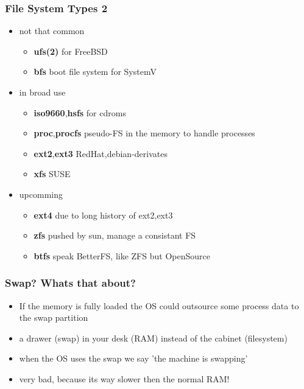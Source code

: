 \documentclass[draft,handout]{beamer}
\begin{document}
        \begin{frame}
			\frametitle{File System Types 2}
            \begin{itemize}
                    \item<1-> not that common
                    \begin{itemize}
                        \item<1-> \textbf{ufs(2)} for FreeBSD
                        \item<1-> \textbf{bfs} boot file system for SystemV
                    \end{itemize}
                    \item<2-> in broad use
                    \begin{itemize}
                        \item<2-> \textbf{iso9660},\textbf{hsfs} for cdroms
                        \item<2-> \textbf{proc},\textbf{procfs} pseudo-FS in the memory to handle processes 
                        \item<2-> \textbf{ext2},\textbf{ext3} RedHat,debian-derivates
                        \item<2-> \textbf{xfs} SUSE 
                    \end{itemize}
                    \item<3-> upcomming
                    \begin{itemize}
                        \item<3-> \textbf{ext4} due to long history of ext2,ext3
                        \item<3-> \textbf{zfs} pushed by sun, manage a consistant FS
                        \item<3-> \textbf{btfs} speak BetterFS, like ZFS but OpenSource
                    \end{itemize}                
            \end{itemize}
		\end{frame}
    	\begin{frame}
			\frametitle{Swap? Whats that about?}
			\begin{itemize}
                \item<1-> If the memory is fully loaded the OS could outsource some process data to the swap partition
                \item<1-> a drawer (swap) in your desk (RAM) instead of the cabinet (filesystem)
                \item<2-> when the OS uses the swap we say 'the machine is swapping'
                \item<2-> very bad, because its way slower then the normal RAM!
            \end{itemize}
		\end{frame}
\end{document}
